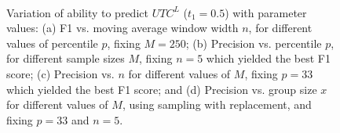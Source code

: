 \begin{figure}[htp]
   \hspace*{\fill}   %
\\
  \hspace*{\fill}   %
   \caption[Identifying Best Parameters for Time Distribution]{Variation of ability to predict $UTC^L$ ($t_1=0.5$) with parameter values: (a) F1 vs. moving average window width $n$, for different values of percentile $p$, fixing $M=250$; (b) Precision vs. percentile $p$, for  different sample sizes $M$, fixing $n=5$ which yielded the best F1 score; (c) Precision vs. $n$ for different values of $M$, fixing $p=33$ which yielded the best F1 score; and (d) Precision vs. group size $x$
for different values of $M$, using sampling with replacement, and fixing  $p=33$ and $n=5$.} \label{fig_2}
\end{figure}

